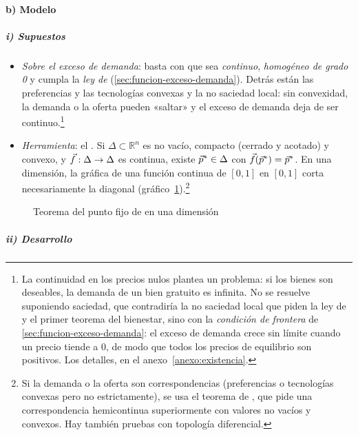 \documentclass[11pt]{article}
\begin{document}
\paragraph{b) Modelo}

\subparagraph{i) Supuestos}

\begin{itemize}
\item \emph{Sobre el exceso de demanda}: basta con que sea \emph{continuo}, \emph{homogéneo de grado 0} y cumpla la \emph{ley de } (\ref{sec:funcion-exceso-demanda}). Detrás están las preferencias y las tecnologías convexas y la no saciedad local: sin convexidad, la demanda o la oferta pueden «saltar» y el exceso de demanda deja de ser continuo.\footnote{La continuidad en los precios nulos plantea un problema: si los bienes son deseables, la demanda de un bien gratuito es infinita. No se resuelve suponiendo saciedad, que contradiría la no saciedad local que piden la ley de  y el primer teorema del bienestar, sino con la \emph{condición de frontera} de \ref{sec:funcion-exceso-demanda}: el exceso de demanda crece sin límite cuando un precio tiende a 0, de modo que todos los precios de equilibrio son positivos\nocite{MasColellWhinstonGreen1995}. Los detalles, en el anexo~\ref{anexo:existencia}.}
\item \emph{Herramienta}: el \nocite{Brouwer1911Abbildung}. Si $\Delta\subset\mathbb{R}^n$ es no vacío, compacto (cerrado y acotado) y convexo, y $\vec{f}:\Delta\to\Delta$ es continua, existe $\vec{p}^*\in\Delta$ con $\vec{f}(\vec{p}^*)=\vec{p}^*$. En una dimensión, la gráfica de una función continua de $[0,1]$ en $[0,1]$ corta necesariamente la diagonal (gráfico~\ref{fig:brouwer}).\footnote{Si la demanda o la oferta son correspondencias (preferencias o tecnologías convexas pero no estrictamente), se usa el teorema de \textcite{Kakutani1941Generalization}, que pide una correspondencia hemicontinua superiormente con valores no vacíos y convexos. Hay también pruebas con topología diferencial.}
\end{itemize}

\begin{figure}[H]
\centering
\caption{Teorema del punto fijo de  en una dimensión}\label{fig:brouwer}
\end{figure}

\subparagraph{ii) Desarrollo}
\end{document}
